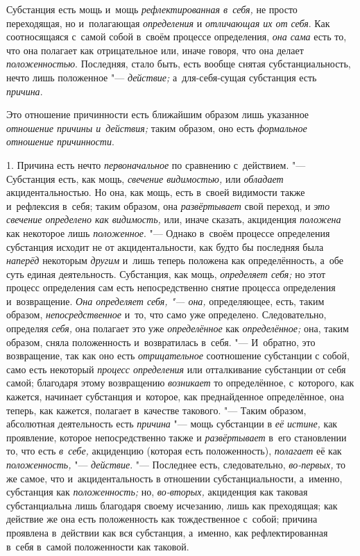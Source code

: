 Субстанция есть мощь и~мощь
{\em рефлектированная в~себя,} не просто переходящая,
но и~полагающая {\em определения} и
{\em отличающая их от себя}. Как соотносящаяся с~самой
собой в~своём процессе определения, {\em она сама} есть
то, что она полагает как отрицательное или, иначе говоря, что она делает
{\em положенностью}. Последняя, стало быть, есть вообще
снятая субстанциальность, нечто лишь положенное
"--- {\em действие;} а~для-себя-сущая субстанция есть {\em причина}.

Это отношение причинности есть ближайшим образом лишь указанное
{\em отношение причины и~действия;} таким образом, оно
есть {\em формальное отношение причинности}.



1. Причина есть нечто {\em первоначальное} по сравнению с~действием. "---
Субстанция есть, как мощь, {\em свечение видимостью,}
или {\em обладает} акцидентальностью. Но она, как мощь,
есть в~своей видимости также и~рефлексия в~себя; таким образом, она
{\em развёртывает} свой переход, и
{\em это свечение определено как видимость,} или, иначе
сказать, акциденция {\em положена} как некоторое лишь
{\em положенное}. "--- Однако в~своём процессе определения
субстанция исходит не от акцидентальности, как будто бы последняя была
{\em наперёд} некоторым {\em другим} и~лишь теперь положена как определённость,
а~обе суть единая деятельность. Субстанция, как мощь,
{\em определяет себя;} но этот процесс определения сам
есть непосредственно снятие процесса определения и~возвращение.
{\em Она определяет себя, "--- она,} определяющее, есть,
таким образом, {\em непосредственное} и~то, что само
уже определено. Следовательно, определяя {\em себя,}
она полагает это уже {\em определённое} как
{\em определённое;} она, таким образом, сняла
положенность и~возвратилась в~себя. "--- И~обратно, это возвращение, так как
оно есть {\em отрицательное} соотношение субстанции с
собой, само есть некоторый {\em процесс определения}
или отталкивание субстанции от себя самой; благодаря этому возвращению
{\em возникает} то определённое, с~которого, как
кажется, начинает субстанция и~которое, как преднайденное определённое, она
теперь, как кажется, полагает в~качестве такового. "--- Таким образом,
абсолютная деятельность есть {\em причина} "--- мощь
субстанции в {\em её истине,} как проявление, которое
непосредственно также и {\em развёртывает} в~его
становлении то, что есть {\em в~себе,} акциденцию
(которая есть положенность), {\em полагает} её как {\em положенность,} "---
{\em действие}. "--- Последнее есть, следовательно,
{\em во-первых,} то же самое, что и~акцидентальность в
отношении субстанциальности, а~именно, субстанция как {\em положенность;}
но, {\em во-вторых,} акциденция как таковая субстанциальна
лишь благодаря своему исчезанию, лишь как преходящая; как действие же она
есть положенность как тождественное с~собой; причина проявлена в~действии
как вся субстанция, а~именно, как рефлектированная в~себя в~самой
положенности как таковой.

